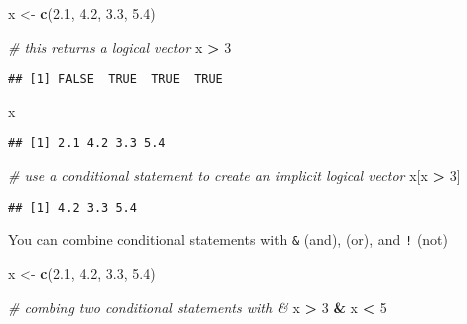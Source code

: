\documentclass[
]{book}
\newenvironment{Shaded}{\begin{snugshade}}{\end{snugshade}}
\newcommand{\CommentTok}[1]{\textcolor[rgb]{0.56,0.35,0.01}{\textit{#1}}}
\newcommand{\DecValTok}[1]{\textcolor[rgb]{0.00,0.00,0.81}{#1}}
\newcommand{\FloatTok}[1]{\textcolor[rgb]{0.00,0.00,0.81}{#1}}
\newcommand{\KeywordTok}[1]{\textcolor[rgb]{0.13,0.29,0.53}{\textbf{#1}}}
\newcommand{\NormalTok}[1]{#1}
\newcommand{\OperatorTok}[1]{\textcolor[rgb]{0.81,0.36,0.00}{\textbf{#1}}}
\newcommand{\StringTok}[1]{\textcolor[rgb]{0.31,0.60,0.02}{#1}}
\begin{document}
\begin{Shaded}
\begin{Highlighting}[]
\NormalTok{x \textless{}{-}}\StringTok{ }\KeywordTok{c}\NormalTok{(}\FloatTok{2.1}\NormalTok{, }\FloatTok{4.2}\NormalTok{, }\FloatTok{3.3}\NormalTok{, }\FloatTok{5.4}\NormalTok{)}

\CommentTok{\# this returns a logical vector}
\NormalTok{x }\OperatorTok{\textgreater{}}\StringTok{ }\DecValTok{3}
\end{Highlighting}
\end{Shaded}

\begin{verbatim}
## [1] FALSE  TRUE  TRUE  TRUE
\end{verbatim}

\begin{Shaded}
\begin{Highlighting}[]
\NormalTok{x}
\end{Highlighting}
\end{Shaded}

\begin{verbatim}
## [1] 2.1 4.2 3.3 5.4
\end{verbatim}

\begin{Shaded}
\begin{Highlighting}[]
\CommentTok{\# use a conditional statement to create an implicit logical vector}
\NormalTok{x[x }\OperatorTok{\textgreater{}}\StringTok{ }\DecValTok{3}\NormalTok{]}
\end{Highlighting}
\end{Shaded}

\begin{verbatim}
## [1] 4.2 3.3 5.4
\end{verbatim}

You can combine conditional statements with \texttt{\&} (and), \texttt{\textbar{}} (or), and \texttt{!} (not)

\begin{Shaded}
\begin{Highlighting}[]
\NormalTok{x \textless{}{-}}\StringTok{ }\KeywordTok{c}\NormalTok{(}\FloatTok{2.1}\NormalTok{, }\FloatTok{4.2}\NormalTok{, }\FloatTok{3.3}\NormalTok{, }\FloatTok{5.4}\NormalTok{)}

\CommentTok{\# combing two conditional statements with \&}
\NormalTok{x }\OperatorTok{\textgreater{}}\StringTok{ }\DecValTok{3} \OperatorTok{\&}\StringTok{ }\NormalTok{x }\OperatorTok{\textless{}}\StringTok{ }\DecValTok{5}
\end{Highlighting}
\end{Shaded}
\end{document}
